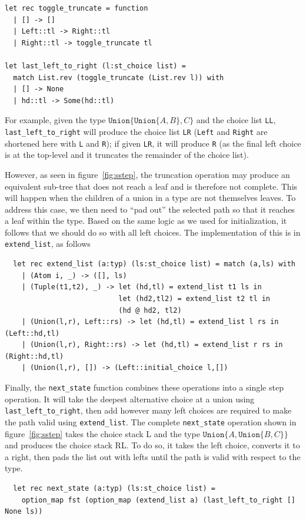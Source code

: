 \documentclass[a4paper,english]{lipics-v2019}
\newcommand{\xt}[1]{\texttt{#1}}
\newcommand{\union}[2]{\xt{Union\{}#1,#2\xt{\}}}
\begin{document}
\begin{small}
\begin{verbatim}
let rec toggle_truncate = function
  | [] -> []    
  | Left::tl -> Right::tl
  | Right::tl -> toggle_truncate tl

let last_left_to_right (l:st_choice list) =
  match List.rev (toggle_truncate (List.rev l)) with
  | [] -> None
  | hd::tl -> Some(hd::tl)
\end{verbatim}
\end{small}

For example, given the type $\union{\union{A}{B}}{C}$ and the choice list
\verb+LL+, \verb|last_left_to_right| will produce the choice list \verb+LR+
(\verb+Left+ and \verb+Right+ are shortened here with \verb+L+ and \verb+R+);
if given \verb+LR+, it will produce \verb+R+ (as the final left choice is at
the top-level and it truncates the remainder of the choice list).

However, as seen in figure~\ref{fig:sstep}, the truncation operation may produce
an equivalent sub-tree that does not reach a leaf and is therefore not complete.
This will happen when the children of a union in a type are not themselves leaves.
To address this case, we then need to ``pad out'' the selected path so that it reaches
a leaf within the type. Based on the same logic as we used for initialization, it follows
that we should do so with all left choices. The implementation of this is in \verb|extend_list|,
as follows
\begin{small}
\begin{verbatim}
  let rec extend_list (a:typ) (ls:st_choice list) = match (a,ls) with
    | (Atom i, _) -> ([], ls)
    | (Tuple(t1,t2), _) -> let (hd,tl) = extend_list t1 ls in
                           let (hd2,tl2) = extend_list t2 tl in
                           (hd @ hd2, tl2)
    | (Union(l,r), Left::rs) -> let (hd,tl) = extend_list l rs in (Left::hd,tl)
    | (Union(l,r), Right::rs) -> let (hd,tl) = extend_list r rs in (Right::hd,tl)
    | (Union(l,r), []) -> (Left::initial_choice l,[])
\end{verbatim}
\end{small}


Finally, the \verb|next_state| function combines these operations into
a single step operation. It will take the deepest alternative choice
at a union using \verb|last_left_to_right|, then add however many left
choices are required to make the path valid using \verb|extend_list|. The
complete \verb|next_state| operation shown in figure~\ref{fig:sstep} takes
the choice stack L and the type $\union{A}{\union{B}{C}}$ and produces the
choice stack RL. To do so, it takes the left choice, converts it to a right,
then pads the list out with lefts until the path is valid with respect to the 
type.
\begin{small}
\begin{verbatim}
  let rec next_state (a:typ) (ls:st_choice list) =
    option_map fst (option_map (extend_list a) (last_left_to_right [] None ls))
\end{verbatim}
\end{small}
\end{document}
